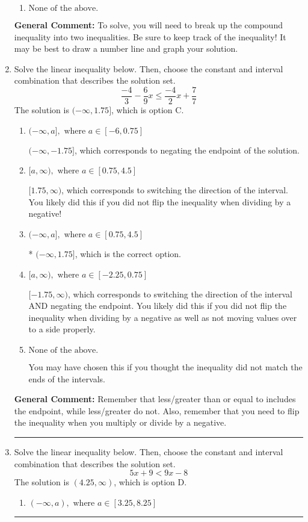 \documentclass{extbook}[14pt]
\newcommand{\litem}[1]{\item #1

\rule{\textwidth}{0.4pt}}
\begin{document}
\begin{enumerate}
{\begin{enumerate}[label=\Alph*.]
$(-\infty, -3.40] \cup (-1.00, \infty)$, which corresponds to displaying the and-inequality as an or-inequality.
\item \( \text{None of the above.} \)


\end{enumerate}

\textbf{General Comment:} To solve, you will need to break up the compound inequality into two inequalities. Be sure to keep track of the inequality! It may be best to draw a number line and graph your solution.
}
\litem{
Solve the linear inequality below. Then, choose the constant and interval combination that describes the solution set.
\[ \frac{-4}{3} - \frac{6}{9} x \leq \frac{-4}{2} x + \frac{7}{7} \]The solution is \( (-\infty, 1.75] \), which is option C.\begin{enumerate}[label=\Alph*.]
\item \( (-\infty, a], \text{ where } a \in [-6, 0.75] \)

 $(-\infty, -1.75]$, which corresponds to negating the endpoint of the solution.
\item \( [a, \infty), \text{ where } a \in [0.75, 4.5] \)

 $[1.75, \infty)$, which corresponds to switching the direction of the interval. You likely did this if you did not flip the inequality when dividing by a negative!
\item \( (-\infty, a], \text{ where } a \in [0.75, 4.5] \)

* $(-\infty, 1.75]$, which is the correct option.
\item \( [a, \infty), \text{ where } a \in [-2.25, 0.75] \)

 $[-1.75, \infty)$, which corresponds to switching the direction of the interval AND negating the endpoint. You likely did this if you did not flip the inequality when dividing by a negative as well as not moving values over to a side properly.
\item \( \text{None of the above}. \)

You may have chosen this if you thought the inequality did not match the ends of the intervals.
\end{enumerate}

\textbf{General Comment:} Remember that less/greater than or equal to includes the endpoint, while less/greater do not. Also, remember that you need to flip the inequality when you multiply or divide by a negative.
}
\litem{
Solve the linear inequality below. Then, choose the constant and interval combination that describes the solution set.
\[ 5x + 9 < 9x -8 \]The solution is \( (4.25, \infty) \), which is option D.\begin{enumerate}[label=\Alph*.]
\item \( (-\infty, a), \text{ where } a \in [3.25, 8.25] \)


\end{enumerate}}
\end{enumerate}
\end{document}

